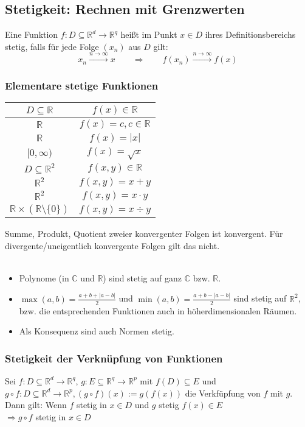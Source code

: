 \documentclass[10pt,a4paper^, twocolumn]{article}
\begin{document}
\subsection{Stetigkeit: Rechnen mit Grenzwerten}
	Eine Funktion $f : D \subseteq \mathbb{R}^d \to \mathbb{R}^q$ heißt 
	im Punkt $x \in D$ ihres Definitionsbereichs stetig, falls für jede Folge 
	$(x_n)$ aus $D$ gilt:
	$$
		x_n \overset{n \to \infty}{\to} x
		\qquad \Rightarrow \qquad
		f(x_n) \overset{n \to \infty}{\to} f(x)
	$$
	\subsubsection{Elementare stetige Funktionen}
	\begin{center}
	\newcommand{\infowidth}{2cm}
	\newcommand{\aufsichtwidth}{10cm}
	\begin{tabular}{|c|c|}
	\hline
	$D \subseteq \mathbb{R}$ &  $f(x) \in \mathbb{R}$ \\
	\hline
	$\mathbb{R}$ & $f(x) = c, c \in \mathbb{R}$\\
	$\mathbb{R}$ & $f(x) = |x|$\\
	$[0, \infty)$& $f(x) = \sqrt{x}$\\
	\hline
	$D \subseteq \mathbb{R}^2$ &  $f(x, y) \in \mathbb{R}$ \\
	\hline
	$\mathbb{R}^2$ & $f(x, y) = x+y$\\
	$\mathbb{R}^2$ & $f(x, y) = x \cdot y$\\
	$\mathbb{R} \times (\mathbb{R} \setminus \{0\}) $ & $f(x, y) = x \div y$\\
	\hline
	\end{tabular}
	\end{center}
	Summe, Produkt, Quotient zweier konvergenter Folgen ist konvergent. Für
	divergente/uneigentlich konvergente Folgen gilt das nicht.\\
	\\
	\begin{itemize}
	\item Polynome (in $\mathbb{C}$ und $\mathbb{R}$) sind stetig auf ganz $\mathbb{C}$ 
	bzw. $\mathbb{R}$.
	\item $\max(a,b) = \frac{a + b + |a-b|}{2}$ und $\min(a,b) = \frac{a+b - |a-b|}{2}$ 
	sind stetig auf $\mathbb{R}^2$, bzw. die entsprechenden Funktionen auch in 
	höherdimensionalen Räumen.
	\item Als Konsequenz sind auch Normen stetig.
	\end{itemize}
	
	
	\subsubsection{Stetigkeit der Verknüpfung von Funktionen}
		Sei $f : D \subseteq \mathbb{R}^d \to \mathbb{R}^q$, 
		$g : E \subseteq \mathbb{R}^q \to \mathbb{R}^p$ mit 
		$f(D) \subseteq E$ und \\
		$g \circ f : D \subseteq \mathbb{R}^d \to \mathbb{R}^p, 
		(g \circ f)(x) := g(f(x))$ die Verkfüpfung von $f$ mit $g$. 
		Dann gilt: Wenn $f$ stetig in $x \in D$ und $g$ stetig $f(x) \in E$\\
		$\Rightarrow g \circ f$ stetig in $x \in D$
\end{document}
